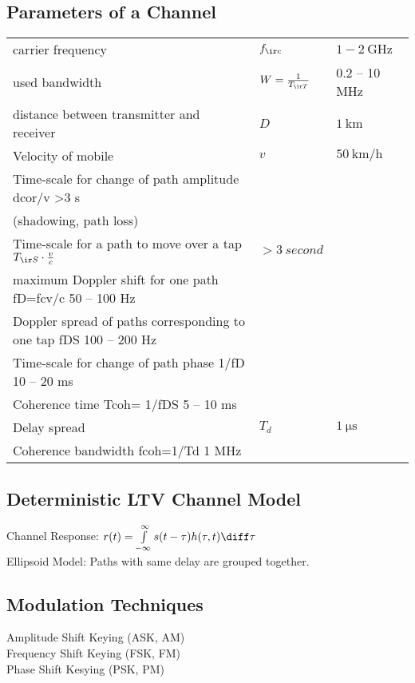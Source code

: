 \documentclass[fs, footer]{latex4ei}
\begin{document}
\begin{multicols*}{4}
	\subsection{Parameters of a Channel}
	\begin{tabular}{lll}
	carrier frequency & $f_{\ir c}$ & $1 - \SI{2}{\giga\hertz}$ \\
	used bandwidth & $W = \frac{1}{T_{\ir T}}$ & 0.2 – 10 MHz\\
	distance between transmitter and receiver & $D$ & $\SI{1}{\kilo\meter}$\\
	Velocity of mobile & $v$ & $\SI{50}{\kilo\meter\per\hour}$\\
	Time-scale for change of path amplitude dcor/v >3 s\\
	(shadowing, path loss) \\
	Time-scale for a path to move over a tap $T_{\ir S} \cdot \frac{v}{c}$ & $>\SI{3}{second}$\\
	maximum Doppler shift for one path fD=fcv/c 50 – 100 Hz\\
	Doppler spread of paths corresponding to one tap fDS 100 – 200 Hz\\
	Time-scale for change of path phase 1/fD 10 – 20 ms\\
	Coherence time Tcoh= 1/fDS 5 – 10 ms\\
	Delay spread & $T_d$ & $\SI{1}{\micro\second}$\\
	Coherence bandwidth fcoh=1/Td 1 MHz\\
	\end{tabular}
	
	

	\subsection{Deterministic LTV Channel Model}
	Channel Response: $r(t) = \int\limits_{-\infty}^\infty s(t-\tau) h(\tau,t) \diff \tau$\\
	Ellipsoid Model: Paths with same delay are grouped together.



	\subsection{Modulation Techniques}
	Amplitude Shift Keying (ASK, AM)\\
	Frequency Shift Keying (FSK, FM)\\
	Phase Shift Kesying (PSK, PM)\\
	

\end{multicols*}
\end{document}
